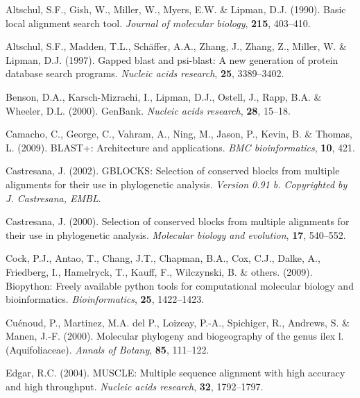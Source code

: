 \documentclass[]{article}
\begin{document}
\hypertarget{refs}{}
\leavevmode\hypertarget{ref-altschul1990basic}{}%
Altschul, S.F., Gish, W., Miller, W., Myers, E.W. \& Lipman, D.J. (1990). Basic local alignment search tool. \emph{Journal of molecular biology}, \textbf{215}, 403--410.

\leavevmode\hypertarget{ref-altschul1997gapped}{}%
Altschul, S.F., Madden, T.L., Schäffer, A.A., Zhang, J., Zhang, Z., Miller, W. \& Lipman, D.J. (1997). Gapped blast and psi-blast: A new generation of protein database search programs. \emph{Nucleic acids research}, \textbf{25}, 3389--3402.

\leavevmode\hypertarget{ref-benson2000genbank}{}%
Benson, D.A., Karsch-Mizrachi, I., Lipman, D.J., Ostell, J., Rapp, B.A. \& Wheeler, D.L. (2000). GenBank. \emph{Nucleic acids research}, \textbf{28}, 15--18.

\leavevmode\hypertarget{ref-camacho2009blast}{}%
Camacho, C., George, C., Vahram, A., Ning, M., Jason, P., Kevin, B. \& Thomas, L. (2009). BLAST+: Architecture and applications. \emph{BMC bioinformatics}, \textbf{10}, 421.

\leavevmode\hypertarget{ref-castresana2002gblocks}{}%
Castresana, J. (2002). GBLOCKS: Selection of conserved blocks from multiple alignments for their use in phylogenetic analysis. \emph{Version 0.91 b. Copyrighted by J. Castresana, EMBL}.

\leavevmode\hypertarget{ref-castresana2000selection}{}%
Castresana, J. (2000). Selection of conserved blocks from multiple alignments for their use in phylogenetic analysis. \emph{Molecular biology and evolution}, \textbf{17}, 540--552.

\leavevmode\hypertarget{ref-cock2009biopython}{}%
Cock, P.J., Antao, T., Chang, J.T., Chapman, B.A., Cox, C.J., Dalke, A., Friedberg, I., Hamelryck, T., Kauff, F., Wilczynski, B. \& others. (2009). Biopython: Freely available python tools for computational molecular biology and bioinformatics. \emph{Bioinformatics}, \textbf{25}, 1422--1423.

\leavevmode\hypertarget{ref-cuenoud2000molecular}{}%
Cuénoud, P., Martinez, M.A. del P., Loizeay, P.-A., Spichiger, R., Andrews, S. \& Manen, J.-F. (2000). Molecular phylogeny and biogeography of the genus ilex l.(Aquifoliaceae). \emph{Annals of Botany}, \textbf{85}, 111--122.

\leavevmode\hypertarget{ref-edgar2004muscle}{}%
Edgar, R.C. (2004). MUSCLE: Multiple sequence alignment with high accuracy and high throughput. \emph{Nucleic acids research}, \textbf{32}, 1792--1797.
\end{document}
